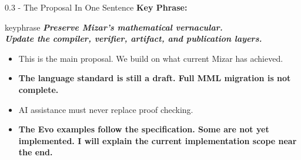 \documentclass[aspectratio=169,11pt]{beamer}
\begin{document}
\begin{frame}[fragile,t]{0.3 - The Proposal In One Sentence}
\smallskip
\textbf{Key Phrase:}
\begin{center}
\begin{beamercolorbox}[rounded=true,sep=2.5mm,wd=0.9\textwidth]{keyphrase}
\centering\itshape \textcolor{blue!55!black}{\textbf{Preserve Mizar's mathematical vernacular.}}\\ \textcolor{blue!55!black}{\textbf{Update the compiler, verifier, artifact, and publication layers.}}
\end{beamercolorbox}
\end{center}
\begin{itemize}
\setlength{\itemsep}{1pt}
\setlength{\parsep}{0pt}
\setlength{\parskip}{0pt}
\item This is the main proposal. We build on what current Mizar has achieved.
\item \textcolor{blue!55!black}{\textbf{The language standard is still a draft. Full MML migration is not complete.}}
\item AI assistance must never replace proof checking.
\item \textcolor{blue!55!black}{\textbf{The Evo examples follow the specification. Some are not yet implemented. I will explain the current implementation scope near the end.}}
\end{itemize}
\end{frame}
\end{document}
